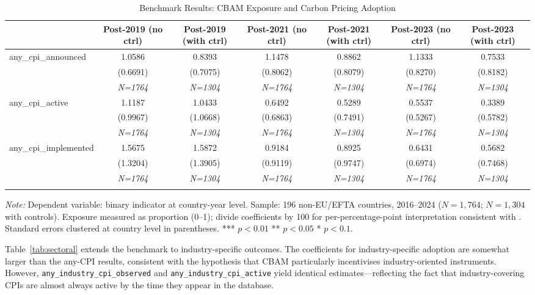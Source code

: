 \documentclass[12pt,a4paper]{article}
\begin{document}
\begin{table}[htbp]
\centering
\begin{threeparttable}
\caption{Benchmark Results: CBAM Exposure and Carbon Pricing Adoption}\label{tab:benchmark}
\small
\begin{tabular}{lcccccc}
\toprule
 & Post-2019 (no ctrl) & Post-2019 (with ctrl) & Post-2021 (no ctrl) & Post-2021 (with ctrl) & Post-2023 (no ctrl) & Post-2023 (with ctrl) \\
\midrule
any\_cpi\_announced & 1.0586 & 0.8393 & 1.1478 & 0.8862 & 1.1333 & 0.7533 \\
 & (0.6691) & (0.7075) & (0.8062) & (0.8079) & (0.8270) & (0.8182) \\
 & \textit{N=1764} & \textit{N=1304} & \textit{N=1764} & \textit{N=1304} & \textit{N=1764} & \textit{N=1304} \\
\addlinespace
any\_cpi\_active & 1.1187 & 1.0433 & 0.6492 & 0.5289 & 0.5537 & 0.3389 \\
 & (0.9967) & (1.0668) & (0.6863) & (0.7491) & (0.5267) & (0.5782) \\
 & \textit{N=1764} & \textit{N=1304} & \textit{N=1764} & \textit{N=1304} & \textit{N=1764} & \textit{N=1304} \\
\addlinespace
any\_cpi\_implemented & 1.5675 & 1.5872 & 0.9184 & 0.8925 & 0.6431 & 0.5682 \\
 & (1.3204) & (1.3905) & (0.9119) & (0.9747) & (0.6974) & (0.7468) \\
 & \textit{N=1764} & \textit{N=1304} & \textit{N=1764} & \textit{N=1304} & \textit{N=1764} & \textit{N=1304} \\
\addlinespace
\bottomrule
\end{tabular}
\begin{tablenotes}\small
\item \textit{Note:} Dependent variable: binary indicator at country-year level. Sample: 196 non-EU/EFTA countries, 2016--2024 ($N=1{,}764$; $N=1{,}304$ with controls). Exposure measured as proportion (0--1); divide coefficients by 100 for per-percentage-point interpretation consistent with \citet{Bahi2026}. Standard errors clustered at country level in parentheses. *** $p<0.01$ ** $p<0.05$ * $p<0.1$.
\end{tablenotes}
\end{threeparttable}
\end{table}

Table~\ref{tab:sectoral} extends the benchmark to industry-specific outcomes. The coefficients for industry-specific adoption are somewhat larger than the any-CPI results, consistent with the hypothesis that CBAM particularly incentivises industry-oriented instruments. However, \texttt{any\_industry\_cpi\_observed} and \texttt{any\_industry\_cpi\_active} yield identical estimates---reflecting the fact that industry-covering CPIs are almost always active by the time they appear in the database.
\end{document}
